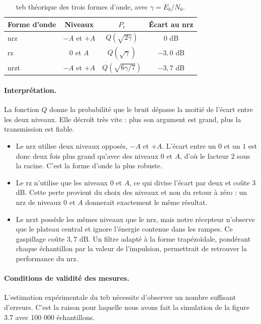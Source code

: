 \documentclass[a4paper,12pt]{report}
\begin{document}
\begin{table}[H]
\centering
\begin{tabular}{lccc}
\hline
Forme d'onde & Niveaux & $P_e$ & Écart au \gls{nrz} \\
\hline
\gls{nrz}  & $-A$ et $+A$ & $Q\!\left(\sqrt{2\gamma}\right)$     & $0$ dB \\
\gls{rz}   & $0$ et $A$   & $Q\!\left(\sqrt{\gamma}\right)$      & $-3{,}0$ dB \\
\gls{nrzt} & $-A$ et $+A$ & $Q\!\left(\sqrt{6\gamma/7}\right)$   & $-3{,}7$ dB \\
\hline
\end{tabular}
\caption{\gls{teb} théorique des trois formes d'onde, avec $\gamma = E_b/N_0$.}
\label{tab:teb-theorique}
\end{table}

\paragraph{Interprétation.}
La fonction $Q$ donne la probabilité que le bruit dépasse la moitié de l'écart
entre les deux niveaux. Elle décroît très vite : plus son argument est grand,
plus la transmission est fiable.

\begin{itemize}
    \item Le \gls{nrz} utilise deux niveaux opposés, $-A$ et $+A$. L'écart
          entre un $0$ et un $1$ est donc deux fois plus grand qu'avec des
          niveaux $0$ et $A$, d'où le facteur $2$ sous la racine. C'est la
          forme d'onde la plus robuste.
    \item Le \gls{rz} n'utilise que les niveaux $0$ et $A$, ce qui divise
          l'écart par deux et coûte $3$ dB. Cette perte provient du choix des
          niveaux et non du retour à zéro : un \gls{nrz} de niveaux $0$ et $A$
          donnerait exactement le même résultat.
    \item Le \gls{nrzt} possède les mêmes niveaux que le \gls{nrz}, mais notre
          récepteur n'observe que le plateau central et ignore l'énergie
          contenue dans les rampes. Ce gaspillage coûte $3{,}7$ dB. Un filtre
          adapté à la forme trapézoïdale, pondérant chaque échantillon par la
          valeur de l'impulsion, permettrait de retrouver la performance du
          \gls{nrz}.
\end{itemize}

\paragraph{Conditions de validité des mesures.}
L'estimation expérimentale du \gls{teb} nécessite d'observer un nombre suffisant d'erreurs. C'est la raison pour laquelle nous avons fait la simulation de la figure 3.7 avec 100 000 échantillons.
\end{document}
